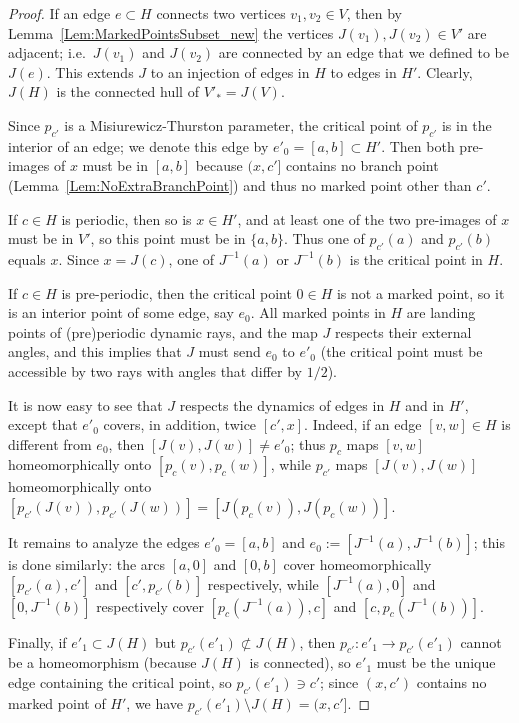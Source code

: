\documentclass[12pt]{amsart}
\newcommand{\sm}{\setminus}
\newcommand{\0}{\texttt{0}}
\newcommand{\1}{\texttt{1}}
\theoremstyle{definition}
\numberwithin{equation}{section}
\begin{document}
\begin{proof}
If an edge $e\subset H$ connects two vertices $v_1, v_2\in V$, then by Lemma~\ref{Lem:MarkedPointsSubset_new} the vertices $J(v_1), J(v_2)\in V'$ are adjacent; i.e.\ $J(v_1)$ and $J(v_2)$ are connected by an edge that we defined to be $J(e)$. This extends $J$ to an injection of edges in $H$ to edges in $H'$. Clearly, $J(H)$ is the connected hull of $V'_*=J(V)$. 

Since $p_{c'}$ is a Misiurewicz-Thurston parameter, the critical point of $p_{c'}$ is in the interior of an edge; we denote this edge by $e'_0=[a,b]\subset H'$. Then both pre-images of $x$ must be in $[a,b]$ because $(x,c']$ contains no branch point (Lemma~\ref{Lem:NoExtraBranchPoint}) and thus no marked point other than $c'$.

If $c\in H$ is periodic, then so is $x\in H'$, and at least one of the two pre-images of $x$ must be in $V'$, so this point must be in $\{a,b\}$. Thus one of $p_{c'}(a)$ and $p_{c'}(b)$ equals $x$. Since $x=J(c)$, one of $J^{-1}(a)$ or $J^{-1}(b)$ is the critical point in $H$.



If $c\in H$ is pre-periodic, then the critical point $0\in H$ is not a marked point, so it is an interior point of some edge, say $e_0$. All marked points in $H$ are landing points of (pre)periodic dynamic rays, and the map $J$ respects their external angles, and this implies that $J$ must send $e_0$ to $e'_0$ (the critical point must be accessible by two rays with angles that differ by $1/2$). 



It is now easy to see that $J$ respects the dynamics of edges in $H$ and in $H'$, except that $e'_0$ covers, in addition, twice $[c',x]$. Indeed, if an edge $[v,w]\in H$ is different from $e_0$, then  $[J(v),J(w)]\not= e'_0$; thus $p_{c}$ maps $[v,w]$ homeomorphically onto $[p_{c}(v),p_{c}(w)]$, while $p_{c'}$ maps $[J(v),J(w)]$ homeomorphically onto $[p_{c'}(J(v)),p_{c'}(J(w))]=[J(p_c(v)),J(p_c(w))]$.

It remains to analyze the edges $e'_0=[a,b]$ and $e_0:=[J^{-1}(a),J^{-1}(b)]$; this is done similarly: 
the arcs $[a,0]$ and $[0,b]$ cover homeomorphically $[p_{c'}(a),c']$ and $[c',p_{c'}(b)]$ respectively, while $[J^{-1}(a),0]$ and $[0,J^{-1}(b)]$ respectively cover  $[p_{c}(J^{-1}(a)),c]$ and $[c,p_{c}(J^{-1}(b))]$. 

Finally, if $e'_1\subset J(H)$ but $p_{c'}(e'_1)\not\subset J(H)$, then $p_{c'}\colon e'_1\to p_{c'}(e'_1)$ cannot be a homeomorphism (because $J(H)$ is connected), so $e'_1$ must be the unique edge containing the critical point, so $p_{c'}(e'_1)\ni c'$; since $(x,c')$ contains no marked point of $H'$, we have $p_{c'}(e'_1)\sm J(H)=(x,c']$. 
\end{proof}
\end{document}
